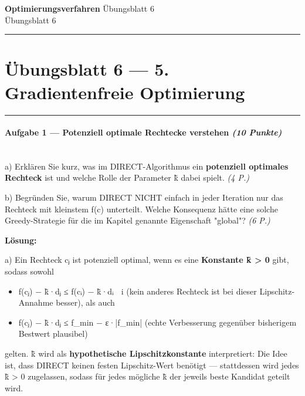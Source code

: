 \documentclass[11pt, a4paper]{article}
\providecommand{\nichttitle}{Übungsblatt}
\providecommand{\nichtsubtitle}{}
\renewcommand{\nichttitle}{Optimierungsverfahren}
\renewcommand{\nichtsubtitle}{Übungsblatt 6}
\begin{document}
\begin{center}
{\Large\bfseries\color{accent}\nichttitle}
\ifx\nichtsubtitle\empty\else
  \\[2pt]{\normalsize\color{accent!80!black}\nichtsubtitle}
\fi
\\[2pt]
\color{accent}\rule{0.4\linewidth}{0.8pt}\color{black}
\end{center}
\vspace{4pt}


\section{Übungsblatt 6 — 5. Gradientenfreie Optimierung}


\noindent\textcolor{rulegray}{\rule{\linewidth}{0.4pt}}


\paragraph{Aufgabe 1 — Potenziell optimale Rechtecke verstehen \textit{(10 Punkte)}}\mbox{}\\[2pt]

a) Erklären Sie kurz, was im DIRECT-Algorithmus ein \textbf{potenziell optimales Rechteck} ist und welche Rolle der Parameter k̃ dabei spielt. \textit{(4 P.)}


b) Begründen Sie, warum DIRECT NICHT einfach in jeder Iteration nur das Rechteck mit kleinstem f(c⃗) unterteilt. Welche Konsequenz hätte eine solche Greedy-Strategie für die im Kapitel genannte Eigenschaft "global"? \textit{(6 P.)}


\textbf{Lösung:}


a) Ein Rechteck c⃗ⱼ ist potenziell optimal, wenn es eine \textbf{Konstante k̃ > 0} gibt, sodass sowohl

\begin{itemize}
  \item f(c⃗ⱼ) − k̃·dⱼ ≤ f(c⃗ᵢ) − k̃·dᵢ  ∀ i  (kein anderes Rechteck ist bei dieser Lipschitz-Annahme besser), als auch
  \item f(c⃗ⱼ) − k̃·dⱼ ≤ f\_min − ε·|f\_min|  (echte Verbesserung gegenüber bisherigem Bestwert plausibel)
\end{itemize}

gelten. k̃ wird als \textbf{hypothetische Lipschitzkonstante} interpretiert: Die Idee ist, dass DIRECT keinen festen Lipschitz-Wert benötigt — stattdessen wird jedes k̃ > 0 zugelassen, sodass für jedes mögliche k̃ der jeweils beste Kandidat geteilt wird.
\end{document}
